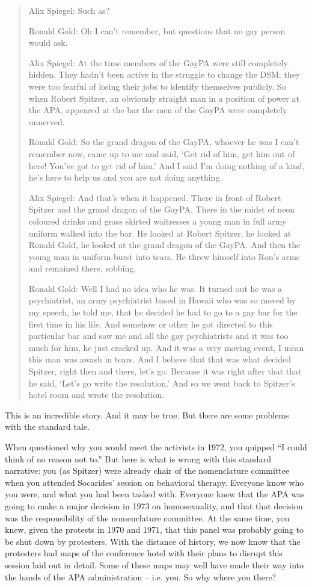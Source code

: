 \begin{refsection}
\begin{quote}
Alix Spiegel: Such as?

Ronald Gold: Oh I can't remember, but questions that no gay person would ask.

Alix Spiegel: At the time members of the GayPA were still completely hidden. They hadn't been active in the struggle to change the DSM; they were too fearful of losing their jobs to identify themselves publicly. So when Robert Spitzer, an obviously straight man in a position of power at the APA, appeared at the bar the men of the GayPA were completely unnerved.

Ronald Gold: So the grand dragon of the GayPA, whoever he was I can't remember now, came up to me and said, `Get rid of him, get him out of here! You've got to get rid of him.' And I said I'm doing nothing of a kind, he's here to help us and you are not doing anything.

Alix Spiegel: And that's when it happened. There in front of Robert Spitzer and the grand dragon of the GayPA. There in the midst of neon coloured drinks and grass skirted waitresses a young man in full army uniform walked into the bar. He looked at Robert Spitzer, he looked at Ronald Gold, he looked at the grand dragon of the GayPA. And then the young man in uniform burst into tears. He threw himself into Ron's arms and remained there, sobbing.

Ronald Gold: Well I had no idea who he was. It turned out he was a psychiatrist, an army psychiatrist based in Hawaii who was so moved by my speech, he told me, that he decided he had to go to a gay bar for the first time in his life. And somehow or other he got directed to this particular bar and saw me and all the gay psychiatrists and it was too much for him, he just cracked up. And it was a very moving event, I mean this man was awash in tears. And I believe that that was what decided Spitzer, right then and there, let's go. Because it was right after that that he said, `Let's go write the resolution.' And so we went back to Spitzer's hotel room and wrote the resolution.
\end{quote}

This is an incredible story. And it may be true. But there are some problems with the standard tale.

When questioned why you would meet the activists in 1972, you quipped ``I could think of no reason not to.'' But here is what is wrong with this standard narrative: you (as Spitzer) were already chair of the nomenclature committee when you attended Socarides' session on behavioral therapy. Everyone know who you were, and what you had been tasked with. Everyone knew that the APA was going to make a major decision in 1973 on homosexuality, and that that decision was the responsibility of the nomenclature committee. At the same time, you knew, given the protests in 1970 and 1971, that this panel was probably going to be shut down by protesters. With the distance of history, we now know that the protesters had maps of the conference hotel with their plans to disrupt this session laid out in detail. Some of these maps may well have made their way into the hands of the APA administration – i.e. you. So why where you there?


\end{refsection}
